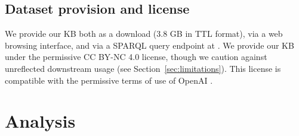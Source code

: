 \begin{table}[t]
\centering
{}
\caption{Statistics of \ourkb. }
\label{tab:statistics}
\end{table}

\section{Dataset provision and license} We provide our KB both as a download (3.8 GB in TTL format), via a web browsing interface, and via a SPARQL query endpoint at \website. We provide our KB under the permissive CC BY-NC 4.0 license, though we caution against unreflected downstream usage (see Section~\ref{sec:limitations}). This license is compatible with the permissive terms of use of OpenAI \cite{openai2022sharingpublicationpolicy}.









\chapter{Analysis}
\label{sec:discussion}

